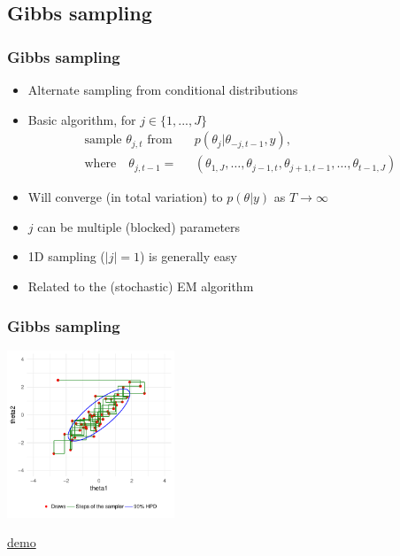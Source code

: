 \documentclass[10pt]{beamer}
\begin{document}

\subsection{Gibbs sampling}

\begin{frame}

\frametitle{Gibbs sampling}

  \begin{itemize}
  \item Alternate sampling from conditional distributions
  \item Basic algorithm, for $j \in \{1,...,J\}$ {
      \begin{align*}
         \text{sample $\theta_{j,t}$ from} \quad & p(\theta_j|\theta_{-j,t-1}, y),\\
      \text{where} \quad
         \theta_{j,t-1} = & (\theta_{1,J},\dots,\theta_{j-1,t},
        \theta_{j+1,t-1},\dots,\theta_{t-1,J})
      \end{align*}
      }
  \item Will converge (in total variation) to $p(\theta|y)$ as $T\rightarrow\infty$\pause
  \item $j$ can be multiple (blocked) parameters
  \item 1D sampling ($|j|=1$) is generally easy\pause
  \item Related to the (stochastic) EM algorithm
  \end{itemize}
\end{frame}

\begin{frame}

\frametitle{Gibbs sampling}

    \vspace{-.5\baselineskip}
     \begin{center}
       \includegraphics[width=5cm]{figs/Gibbs1.pdf}
     \end{center}
    \vspace{-.5\baselineskip}
     \begin{center}
       \href{https://github.com/MansMeg/BSDA/blob/main/lectures/L5/figs/gibbs_example.gif}{demo}
     \end{center}
\end{frame}
\end{document}
